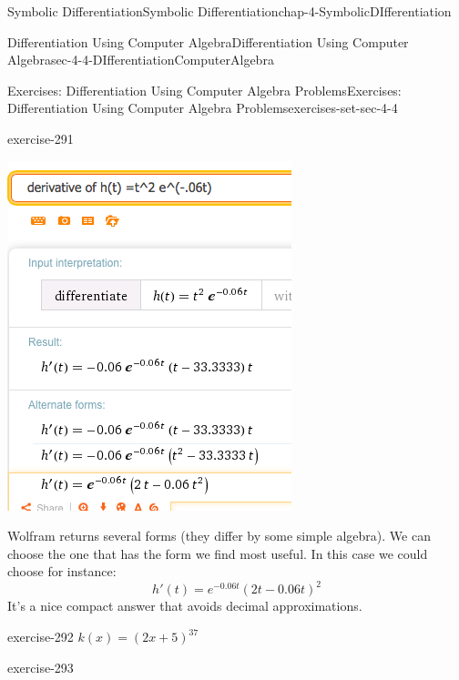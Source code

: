 \documentclass[oneside,10pt,]{book}
\numberwithin{equation}{section}
\begin{document}
\begin{chapterptx}{Symbolic Differentiation}{}{Symbolic Differentiation}{}{}{chap-4-SymbolicDIfferentiation}
\begin{sectionptx}{Differentiation Using Computer Algebra}{}{Differentiation Using Computer Algebra}{}{}{sec-4-4-DIfferentiationComputerAlgebra}
\begin{exercises-subsection-numberless}{Exercises: Differentiation Using Computer Algebra Problems}{}{Exercises: Differentiation Using Computer Algebra Problems}{}{}{exercises-set-sec-4-4}
\begin{divisionexercise}{3}{}{}{exercise-291}
\begin{sidebyside}{1}{0.3}{0.3}{0}%
\begin{sbspanel}{0.4}%
\includegraphics[width=1\linewidth]{images/sec4-4-sol3a.png}
\end{sbspanel}%
\end{sidebyside}%
\par
\hypertarget{p-1745}{}%
Wolfram returns several forms (they differ by some simple algebra). We can choose the one that has the form we find most useful. In this case we could choose for instance:%
%
\begin{equation*}
h' (t)=e^{-0.06t} (2t-0.06 t)^2
\end{equation*}
\hypertarget{p-1746}{}%
It’s a nice compact answer that avoids decimal approximations.%
\end{divisionexercise}%
\begin{divisionexercise}{4}{}{}{exercise-292}%
\hypertarget{p-1747}{}%
\(k(x)=(2x+5)^{37}\)%
\end{divisionexercise}%
\begin{divisionexercise}{5}{}{}{exercise-293}%

\end{divisionexercise}
\end{exercises-subsection-numberless}
\end{sectionptx}
\end{chapterptx}
\end{document}
